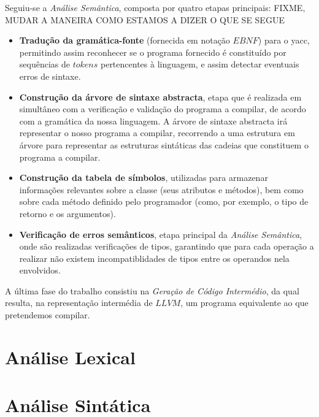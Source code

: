 \documentclass[11pt,a4paper]{article}
\begin{document}
Seguiu-se a \emph{Análise Semântica}, composta por quatro etapas principais: FIXME, MUDAR A MANEIRA COMO ESTAMOS A DIZER O QUE SE SEGUE

\begin{itemize}
\item \textbf{Tradução da gramática-fonte} (fornecida em notação $EBNF$) para o yacc, permitindo assim reconhecer se o programa fornecido é constituído por sequências de $tokens$ pertencentes à linguagem, e assim detectar eventuais erros de sintaxe.

\item \textbf{Construção da árvore de sintaxe abstracta}, etapa que é realizada em simultâneo com a verificação e validação do programa a compilar, de acordo com a gramática da nossa linguagem. A árvore de sintaxe abstracta irá representar o nosso programa a compilar, recorrendo a uma estrutura em árvore para representar as estruturas sintáticas das cadeias que constituem o programa a compilar.

\item \textbf{Construção da tabela de símbolos}, utilizadas para armazenar informações relevantes sobre a classe (seus atributos e métodos), bem como sobre cada método definido pelo programador (como, por exemplo, o tipo de retorno e os argumentos).

\item \textbf{Verificação de erros semânticos}, etapa principal da \emph{Análise Semântica}, onde são realizadas verificações de tipos, garantindo que para cada operação a realizar não existem incompatiblidades de tipos entre os operandos nela envolvidos.
\end{itemize}

A última fase do trabalho consistiu na \emph{Geração de Código Intermédio}, da qual resulta, na representação intermédia de $LLVM$,  um programa equivalente ao que pretendemos compilar.

\pagebreak

\section{Análise Lexical}

\pagebreak

\section{Análise Sintática}

\pagebreak
\end{document}

